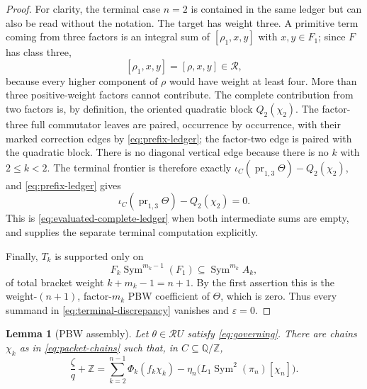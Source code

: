 \documentclass[11pt]{amsart}
\newtheorem{lemma}[theorem]{Lemma}
\theoremstyle{remark}
\newcommand{\Z}{\mathbb Z}
\newcommand{\Q}{\mathbb Q}
\newcommand{\Sym}{\operatorname{Sym}}
\newcommand{\Rel}{\mathcal R}
\newcommand{\pr}{\operatorname{pr}}
\begin{document}
\begin{proof}
	For clarity, the terminal case $n=2$ is contained in the same ledger
	but can also be read without the notation.  The target has weight three.
	A primitive term coming from three factors is an integral sum of
	$[\rho_1,x,y]$ with $x,y\in F_1$; since $F$ has class three,
	\[
	 [\rho_1,x,y]=[\rho,x,y]\in\Rel,
	\]
	because every higher component of $\rho$ would have weight at least
	four.  More than three positive-weight factors cannot contribute.
	The complete contribution from two factors is, by definition, the
	oriented quadratic block $Q_2(\chi_2)$.  The factor-three full
	commutator leaves are paired, occurrence by occurrence, with their
	marked correction edges by \eqref{eq:prefix-ledger}; the factor-two
	edge is paired with the quadratic block.  There is no diagonal vertical
	edge because there is no $k$ with $2\leq k<2$.  The terminal frontier is
	therefore exactly
	$\iota_C(\pr_{1,3}\Theta)-Q_2(\chi_2)$, and
	\eqref{eq:prefix-ledger} gives
	\[
	 \iota_C(\pr_{1,3}\Theta)-Q_2(\chi_2)=0.
	\]
	This is \eqref{eq:evaluated-complete-ledger} when both intermediate sums
	are empty, and supplies the separate terminal computation explicitly.

Finally, $T_k$ is supported only on
\[
 F_k\Sym^{m_k-1}(F_1)\subseteq\Sym^{m_k}A_k,
\]
of total bracket weight $k+m_k-1=n+1$.  By the first assertion this is
the weight-$(n+1)$, factor-$m_k$ PBW coefficient of $\Theta$, which is
zero.  Thus every summand in
\eqref{eq:terminal-discrepancy} vanishes and $\varepsilon=0$.
\end{proof}

\begin{lemma}[PBW assembly]\label{lem:PBW-assembly}
Let $\theta\in\Rel U$ satisfy \eqref{eq:governing}.  There are chains
$\chi_k$ as in \eqref{eq:packet-chains} such that, in
$C\subseteq\Q/\Z$,
\begin{equation}\label{eq:PBW-normal-form}
 \frac{\zeta}{q}+\Z
 =\sum_{k=2}^{n-1}\Phi_k(f_k\chi_k)
 -\eta_n\bigl(L_1\Sym^2(\pi_n)[\chi_n]\bigr).
\end{equation}
\end{lemma}
\end{document}
